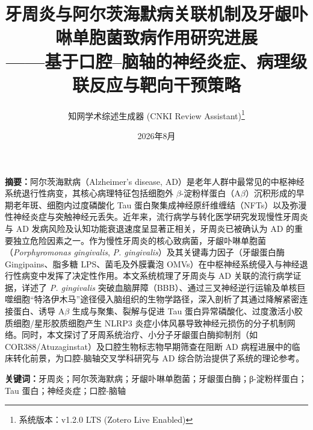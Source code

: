 \documentclass[12pt,a4paper]{ctexart}
\title{\textbf{牙周炎与阿尔茨海默病关联机制及牙龈卟啉单胞菌致病作用研究进展}\\[0.5em]
\large ——基于口腔--脑轴的神经炎症、病理级联反应与靶向干预策略}
\author{知网学术综述生成器 (CNKI Review Assistant)\thanks{系统版本：v1.2.0 LTS (Zotero Live Enabled)}}
\date{2026年8月}
\begin{document}
\maketitle

\noindent\textbf{摘要：}阿尔茨海默病（Alzheimer's disease, AD）是老年人群中最常见的中枢神经系统退行性病变，其核心病理特征包括细胞外 $\beta$-淀粉样蛋白（A$\beta$）沉积形成的早期老年斑、细胞内过度磷酸化 Tau 蛋白聚集成神经原纤维缠结（NFTs）以及弥漫性神经炎症与突触神经元丢失。近年来，流行病学与转化医学研究发现慢性牙周炎与 AD 发病风险及认知功能衰退速度呈显著正相关，牙周炎已被确认为 AD 的重要独立危险因素之一。作为慢性牙周炎的核心致病菌，牙龈卟啉单胞菌（\textit{Porphyromonas gingivalis}, \textit{P. gingivalis}）及其关键毒力因子（牙龈蛋白酶 Gingipains、脂多糖 LPS、菌毛及外膜囊泡 OMVs）在中枢神经系统侵入与神经退行性病变中发挥了决定性作用。本文系统梳理了牙周炎与 AD 关联的流行病学证据，详述了 \textit{P. gingivalis} 突破血脑屏障（BBB）、通过三叉神经逆行运输及单核巨噬细胞“特洛伊木马”途径侵入脑组织的生物学路径，深入剖析了其通过降解紧密连接蛋白、诱导 A$\beta$ 生成与聚集、裂解与促进 Tau 蛋白异常磷酸化、过度激活小胶质细胞/星形胶质细胞产生 NLRP3 炎症小体风暴导致神经元损伤的分子机制网络。同时，本文探讨了牙周系统治疗、小分子牙龈蛋白酶抑制剂（如 COR388/Atuzaginstat）及口腔生物标志物早期筛查在阻断 AD 病程进展中的临床转化前景，为口腔-脑轴交叉学科研究与 AD 综合防治提供了系统的理论参考。

\vspace{0.5em}
\noindent\textbf{关键词：}牙周炎；阿尔茨海默病；牙龈卟啉单胞菌；牙龈蛋白酶；β-淀粉样蛋白；Tau 蛋白；神经炎症；口腔-脑轴
\end{document}

